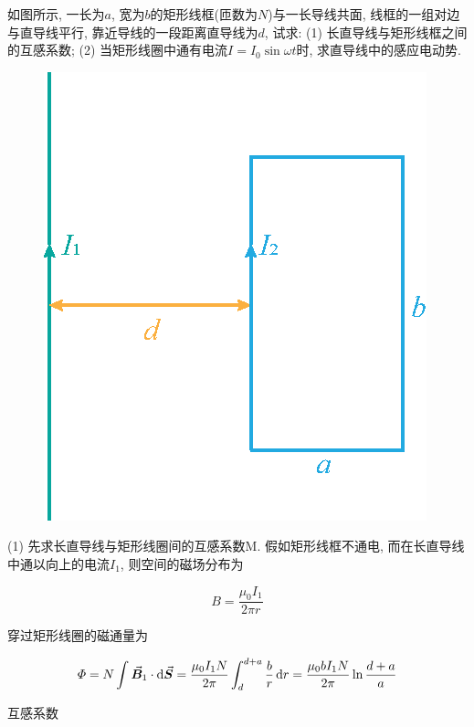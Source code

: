 \begin{example}
	如图所示, 一长为$a$, 宽为$b$的矩形线框(匝数为$N$)与一长导线共面, 线框的一组对边与直导线平行, 靠近导线的一段距离直导线为$d$, 试求: 
	(1) 长直导线与矩形线框之间的互感系数; 
	(2) 当矩形线圈中通有电流$I = I_0 \sin \omega t$时, 求直导线中的感应电动势. 
	
	\begin{figure}[H]
		\centering
		\includegraphics[scale=1.0]{C9-fig5.eps}
	\end{figure}
	
	\begin{solution}
		
		(1) 先求长直导线与矩形线圈间的互感系数M. 假如矩形线框不通电, 而在长直导线中通以向上的电流$I_1$, 则空间的磁场分布为
		
		\begin{equation*}
			B = \dfrac{\mu_0 I_1}{2 \pi r}
		\end{equation*}
		
		穿过矩形线圈的磁通量为
		
		\begin{equation*}
		    \varPhi = N \int \va*{B}_1 \cdot \dd{\va*{S}} = \dfrac{\mu_0 I_1 N}{2 \pi} \int_{d}^{d+a} \dfrac{b}{r} \dd{r} = \dfrac{\mu_0 b I_1 N}{2 \pi} \ln \dfrac{d+a}{a}
		\end{equation*}
		
		互感系数
		

\end{solution}
\end{example}
